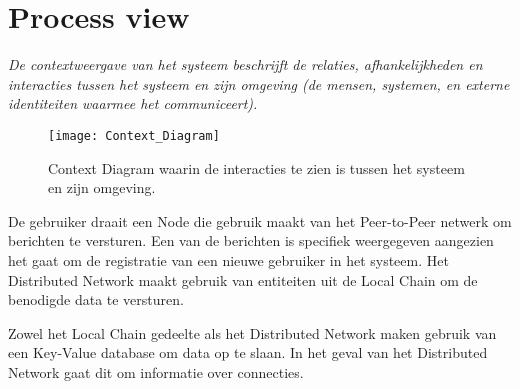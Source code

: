\section{Process view}

\textit{De contextweergave van het systeem beschrijft de relaties, afhankelijkheden en interacties tussen het systeem en zijn omgeving (de mensen, systemen, en externe identiteiten waarmee het communiceert).}

\begin{figure}[h]
  \centering
  \texttt{[image: Context\_Diagram]}
  \caption[Context Diagram] {
    Context Diagram waarin de interacties te zien is tussen het systeem en zijn omgeving.
  }
\end{figure}

De gebruiker draait een Node die gebruik maakt van het Peer-to-Peer netwerk om berichten te versturen. Een van de berichten is specifiek weergegeven aangezien het gaat om de registratie van een nieuwe gebruiker in het systeem. Het Distributed Network maakt gebruik van entiteiten uit de Local Chain om de benodigde data te versturen. 

Zowel het Local Chain gedeelte als het Distributed Network maken gebruik van een Key-Value database om data op te slaan. In het geval van het Distributed Network gaat dit om informatie over connecties.